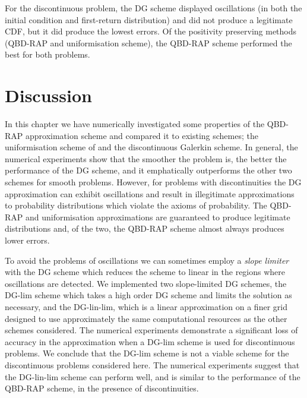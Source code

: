 For the discontinuous problem, the DG scheme displayed oscillations (in both the initial condition and first-return distribution) and did not produce a legitimate CDF, but it did produce the lowest errors. Of the positivity preserving methods (QBD-RAP and uniformisation scheme), the QBD-RAP scheme performed the best for both problems. 
\FloatBarrier


\section{Discussion}
In this chapter we have numerically investigated some properties of the QBD-RAP approximation scheme and compared it to existing schemes; the uniformisation scheme of \cite{bo2013} and the discontinuous Galerkin scheme. In general, the numerical experiments show that the smoother the problem is, the better the performance of the DG scheme, and it emphatically outperforms the other two schemes for smooth problems. However, for problems with discontinuities the DG approximation can exhibit oscillations and result in illegitimate approximations to probability distributions which violate the axioms of probability. The QBD-RAP and uniformisation approximations are guaranteed to produce legitimate distributions and, of the two, the QBD-RAP scheme almost always produces lower errors. 

To avoid the problems of oscillations we can sometimes employ a \emph{slope limiter} with the DG scheme which reduces the scheme to linear in the regions where oscillations are detected. We implemented two slope-limited DG schemes, the DG-lim scheme which takes a high order DG scheme and limits the solution as necessary, and the DG-lin-lim, which is a linear approximation on a finer grid designed to use approximately the same computational resources as the other schemes considered. The numerical experiments demonstrate a significant loss of accuracy in the approximation when a DG-lim scheme is used for discontinuous problems. We conclude that the DG-lim scheme is not a viable scheme for the discontinuous problems considered here. The numerical experiments suggest that the DG-lin-lim scheme can perform well, and is similar to the performance of the QBD-RAP scheme, in the presence of discontinuities. %

